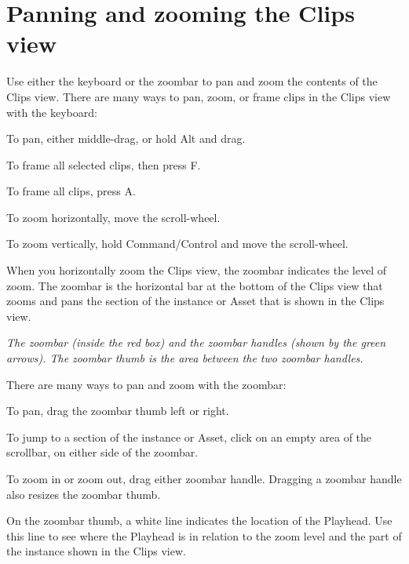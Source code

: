 \chapter{Panning and zooming the Clips view}
\hypertarget{md__library_2_package_cache_2com_8unity_8timeline_0d1_87_86_2_documentation_0i_2clp__pan__zoom}{}\label{md__library_2_package_cache_2com_8unity_8timeline_0d1_87_86_2_documentation_0i_2clp__pan__zoom}
\label{md__library_2_package_cache_2com_8unity_8timeline_0d1_87_86_2_documentation_0i_2clp__pan__zoom_autotoc_md1119}%
%
 Use either the keyboard or the zoombar to pan and zoom the contents of the Clips view. There are many ways to pan, zoom, or frame clips in the Clips view with the keyboard\+:


\begin{DoxyItemize}
\item To pan, either middle-\/drag, or hold Alt and drag.
\item To frame all selected clips,  then press F.
\item To frame all clips, press A.
\item To zoom horizontally, move the scroll-\/wheel.
\item To zoom vertically, hold Command/\+Control and move the scroll-\/wheel.
\end{DoxyItemize}

When you horizontally zoom the Clips view, the zoombar indicates the level of zoom. The zoombar is the horizontal bar at the bottom of the Clips view that zooms and pans the section of the  instance or  Asset that is shown in the Clips view.



{\itshape The zoombar (inside the red box) and the zoombar handles (shown by the green arrows). The zoombar thumb is the area between the two zoombar handles.}

There are many ways to pan and zoom with the zoombar\+:


\begin{DoxyItemize}
\item To pan, drag the zoombar thumb left or right.
\item To jump to a section of the  instance or  Asset, click on an empty area of the scrollbar, on either side of the zoombar.
\item To zoom in or zoom out, drag either zoombar handle. Dragging a zoombar handle also resizes the zoombar thumb.
\end{DoxyItemize}

On the zoombar thumb, a white line indicates the location of the  Playhead. Use this line to see where the  Playhead is in relation to the zoom level and the part of the  instance shown in the Clips view. 